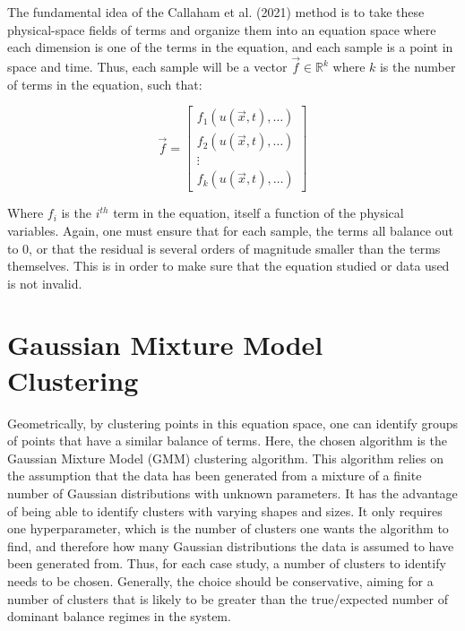 \documentclass[12pt]{report} %
\begin{document}
\vspace{5mm}

The fundamental idea of the Callaham et al. (2021) method is to take these physical-space fields of terms and organize them into an equation space where each dimension is one of the terms in the equation, and each sample is a point in space and time. Thus, each sample will be a vector $\vec{f} \in \mathbb{R}^k$ where $k$ is the number of terms in the equation, such that:

\begin{equation}
    \vec{f} = \begin{bmatrix} f_1(u(\vec{x}, t), \hdots) \\ f_2(u(\vec{x}, t), \hdots) \\ \vdots \\ f_k(u(\vec{x}, t), \hdots) \end{bmatrix}
\end{equation}

Where $f_i$ is the $i^{th}$ term in the equation, itself a function of the physical variables. Again, one must ensure that for each sample, the terms all balance out to 0, or that the residual is several orders of magnitude smaller than the terms themselves. This is in order to make sure that the equation studied or data used is not invalid.


\section{Gaussian Mixture Model Clustering}

Geometrically, by clustering points in this equation space, one can identify groups of points that have a similar balance of terms. Here, the chosen algorithm is the Gaussian Mixture Model (GMM) clustering algorithm. This algorithm relies on the assumption that the data has been generated from a mixture of a finite number of Gaussian distributions with unknown parameters\cite{mit2015algorithmic}. It has the advantage of being able to identify clusters with varying shapes and sizes. It only requires one hyperparameter, which is the number of clusters one wants the algorithm to find, and therefore how many Gaussian distributions the data is assumed to have been generated from\cite{sklearnGMM}. Thus, for each case study, a number of clusters to identify needs to be chosen. Generally, the choice should be conservative, aiming for a number of clusters that is likely to be greater than the true/expected number of dominant balance regimes in the system.
\end{document}
